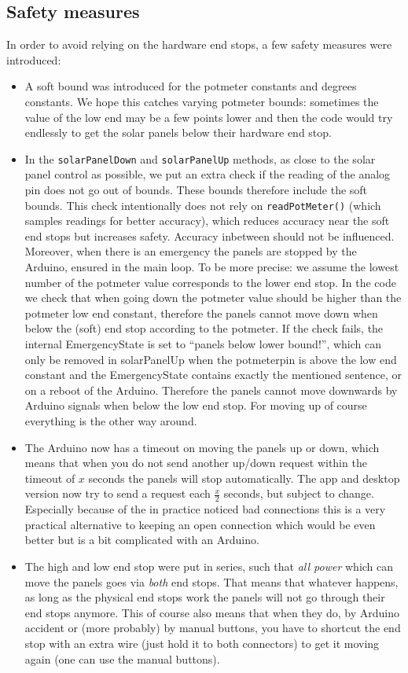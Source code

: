 		\subsection{Safety measures}\label{subsec:safetyMeasures}
			In order to avoid relying on the hardware end stops, a few safety measures were introduced:
			\begin{itemize}
				\item A soft bound was introduced for the potmeter constants and degrees constants.
				We hope this catches varying potmeter bounds: sometimes the value of the low end may be a few points lower and then the code would try endlessly to get the solar panels below their hardware end stop.
				\item In the \verb|solarPanelDown| and \verb|solarPanelUp| methods, as close to the solar panel control as possible, we put an extra check if the reading of the analog pin does not go out of bounds.
				These bounds therefore include the soft bounds.
				This check intentionally does not rely on \verb|readPotMeter()| (which samples readings for better accuracy), which reduces accuracy near the soft end stops but increases safety.
				Accuracy inbetween should not be influenced.
				Moreover, when there is an emergency the panels are stopped by the Arduino, ensured in the main loop.
				To be more precise: we assume the lowest number of the potmeter value corresponds to the lower end stop.
				In the code we check that when going down the potmeter value should be higher than the potmeter low end constant, therefore the panels cannot move down when below the (soft) end stop according to the potmeter.
				If the check fails, the internal EmergencyState is set to ``panels below lower bound!'', which can only be removed in solarPanelUp when the potmeterpin is above the low end constant and the EmergencyState contains exactly the mentioned sentence, or on a reboot of the Arduino.
				Therefore the panels cannot move downwards by Arduino signals when below the low end stop.
				For moving up of course everything is the other way around.
				\item The Arduino now has a timeout on moving the panels up or down, which means that when you do not send another up/down request within the timeout of $x$ seconds the panels will stop automatically.
				The app and desktop version now try to send a request each $\frac{x}{2}$ seconds, but subject to change.
				Especially because of the in practice noticed bad connections this is a very practical alternative to keeping an open connection which would be even better but is a bit complicated with an Arduino.
				\item The high and low end stop were put in series, such that \textit{all power} which can move the panels goes via \textit{both} end stops.
				That means that whatever happens, as long as the physical end stops work the panels will not go through their end stops anymore.
				This of course also means that when they do, by Arduino accident or (more probably) by manual buttons, you have to shortcut the end stop with an extra wire (just hold it to both connectors) to get it moving again (one can use the manual buttons).
			\end{itemize}